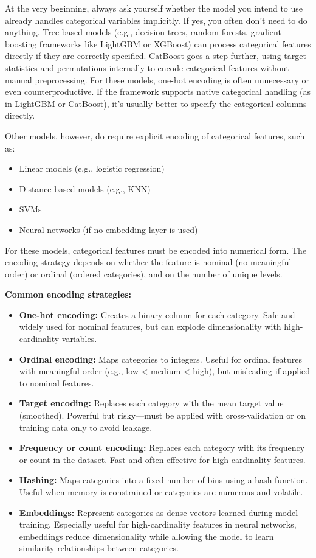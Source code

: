 \documentclass[12pt,openany]{book}
\begin{document}
At the very beginning, always ask yourself whether the model you intend to use already handles categorical variables implicitly. If yes, you often don’t need to do anything. Tree-based models (e.g., decision trees, random forests, gradient boosting frameworks like LightGBM or XGBoost) can process categorical features directly if they are correctly specified. CatBoost goes a step further, using target statistics and permutations internally to encode categorical features without manual preprocessing. For these models, one-hot encoding is often unnecessary or even counterproductive. If the framework supports native categorical handling (as in LightGBM or CatBoost), it’s usually better to specify the categorical columns directly. \newline

Other models, however, do require explicit encoding of categorical features, such as:
\begin{itemize}
    \item Linear models (e.g., logistic regression)
    \item Distance-based models (e.g., KNN)
    \item SVMs
    \item Neural networks (if no embedding layer is used)
\end{itemize}

For these models, categorical features must be encoded into numerical form. The encoding strategy depends on whether the feature is nominal (no meaningful order) or ordinal (ordered categories), and on the number of unique levels. \newline

\textbf{Common encoding strategies:}
\begin{itemize}
    \item \textbf{One-hot encoding:} Creates a binary column for each category. Safe and widely used for nominal features, but can explode dimensionality with high-cardinality variables.
    \item \textbf{Ordinal encoding:} Maps categories to integers. Useful for ordinal features with meaningful order (e.g., low < medium < high), but misleading if applied to nominal features.
    \item \textbf{Target encoding:} Replaces each category with the mean target value (smoothed). Powerful but risky—must be applied with cross-validation or on training data only to avoid leakage.
    \item \textbf{Frequency or count encoding:} Replaces each category with its frequency or count in the dataset. Fast and often effective for high-cardinality features.
    \item \textbf{Hashing:} Maps categories into a fixed number of bins using a hash function. Useful when memory is constrained or categories are numerous and volatile.
    \item \textbf{Embeddings:} Represent categories as dense vectors learned during model training. Especially useful for high-cardinality features in neural networks, embeddings reduce dimensionality while allowing the model to learn similarity relationships between categories.
\end{itemize}
\end{document}

